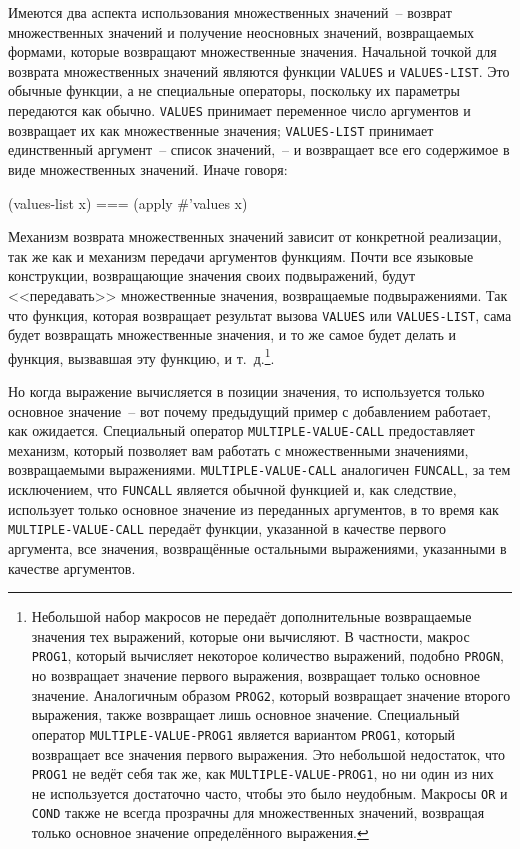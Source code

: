 Имеются два аспекта использования множественных значений~-- возврат множественных
значений и получение неосновных значений, возвращаемых формами, которые возвращают
множественные значения.  Начальной точкой для возврата множественных значений являются
функции \lstinline{VALUES} и \lstinline{VALUES-LIST}.  Это обычные функции, а не специальные
операторы, поскольку их параметры передаются как обычно.  \lstinline{VALUES} принимает переменное
число аргументов и возвращает их как множественные значения; \lstinline{VALUES-LIST} принимает
единственный аргумент~-- список значений,~-- и возвращает все его содержимое в виде
множественных значений.  Иначе говоря:

\begin{myverb}
  (values-list x) === (apply #'values x)
\end{myverb}

Механизм возврата множественных значений зависит от конкретной реализации, так же как и
механизм передачи аргументов функциям.  Почти все языковые конструкции, возвращающие
значения своих подвыражений, будут <<передавать>> множественные значения, возвращаемые
подвыражениями.  Так что функция, которая возвращает результат вызова \lstinline{VALUES} или
\lstinline{VALUES-LIST}, сама будет возвращать множественные значения, и то же самое будет
делать и функция, вызвавшая эту функцию, и т.~д.\footnote{Небольшой набор макросов не
  передаёт дополнительные возвращаемые значения тех выражений, которые они вычисляют.  В
  частности, макрос \lstinline{PROG1}, который вычисляет некоторое количество выражений,
  подобно \lstinline{PROGN}, но возвращает значение первого выражения, возвращает только
  основное значение.  Аналогичным образом \lstinline{PROG2}, который возвращает значение
  второго выражения, также возвращает лишь основное значение.  Специальный оператор
  \lstinline{MULTIPLE-VALUE-PROG1} является вариантом \lstinline{PROG1}, который возвращает все
  значения первого выражения.  Это небольшой недостаток, что \lstinline{PROG1} не ведёт себя
  так же, как \lstinline{MULTIPLE-VALUE-PROG1}, но ни один из них не используется достаточно
  часто, чтобы это было неудобным.  Макросы \lstinline{OR} и \lstinline{COND} также не всегда
  прозрачны для множественных значений, возвращая только основное значение определённого
  выражения.}.

Но когда выражение вычисляется в позиции значения, то используется только основное
значение~-- вот почему предыдущий пример с добавлением работает, как ожидается. Специальный
оператор \lstinline{MULTIPLE-VALUE-CALL} предоставляет механизм, который позволяет вам работать
с множественными значениями, возвращаемыми выражениями. \lstinline{MULTIPLE-VALUE-CALL}
аналогичен \lstinline{FUNCALL}, за тем исключением, что \lstinline{FUNCALL} является обычной
функцией и, как следствие, использует только основное значение из переданных аргументов,
в то время как \lstinline{MULTIPLE-VALUE-CALL} передаёт функции, указанной в качестве первого
аргумента, все значения, возвращённые остальными выражениями, указанными в качестве
аргументов.

